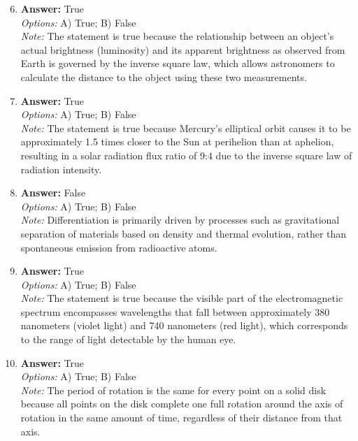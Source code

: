 \documentclass[12pt]{article}
\begin{document}
\begin{enumerate}[label=\arabic*.]
\setcounter{enumi}{5}
\item \textbf{Answer:} True
\\ \textit{Options:} A) True; B) False
\\ \textit{Note:} The statement is true because the relationship between an object's actual brightness (luminosity) and its apparent brightness as observed from Earth is governed by the inverse square law, which allows astronomers to calculate the distance to the object using these two measurements.
\item \textbf{Answer:} True
\\ \textit{Options:} A) True; B) False
\\ \textit{Note:} The statement is true because Mercury's elliptical orbit causes it to be approximately 1.5 times closer to the Sun at perihelion than at aphelion, resulting in a solar radiation flux ratio of 9:4 due to the inverse square law of radiation intensity.
\item \textbf{Answer:} False
\\ \textit{Options:} A) True; B) False
\\ \textit{Note:} Differentiation is primarily driven by processes such as gravitational separation of materials based on density and thermal evolution, rather than spontaneous emission from radioactive atoms.
\item \textbf{Answer:} True
\\ \textit{Options:} A) True; B) False
\\ \textit{Note:} The statement is true because the visible part of the electromagnetic spectrum encompasses wavelengths that fall between approximately 380 nanometers (violet light) and 740 nanometers (red light), which corresponds to the range of light detectable by the human eye.
\item \textbf{Answer:} True
\\ \textit{Options:} A) True; B) False
\\ \textit{Note:} The period of rotation is the same for every point on a solid disk because all points on the disk complete one full rotation around the axis of rotation in the same amount of time, regardless of their distance from that axis.
\end{enumerate}
\end{document}
